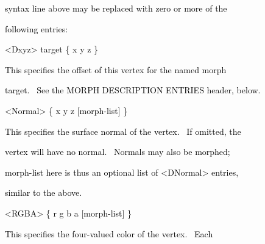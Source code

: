 \documentclass[a4paper]{article}
\newcommand\textstyleOOoComputerKeyWord[1]{\textrm{\textcolor[rgb]{0.0,0.0,0.5019608}{#1}}}
\begin{document}
{\color{black}
\textstyleOOoComputerKeyWord{\textcolor{black}{\ \ \ \ syntax line above may be replaced with zero or more of the}}}

{\color{black}
\textstyleOOoComputerKeyWord{\textcolor{black}{\ \ \ \ following entries:}}}


\bigskip


\bigskip


\bigskip

{\color{black}
\textstyleOOoComputerKeyWord{\textcolor{black}{\ \ \ \ {\textless}Dxyz{\textgreater} target \{ x y z \}}}}


\bigskip

{\color{black}
\textstyleOOoComputerKeyWord{\textcolor{black}{\ \ \ \ This specifies the offset of this vertex for the named morph}}}

{\color{black}
\textstyleOOoComputerKeyWord{\textcolor{black}{\ \ \ \ target. \ See the {\textquotedbl}MORPH DESCRIPTION
ENTRIES{\textquotedbl} header, below.}}}


\bigskip


\bigskip

{\color{black}
\textstyleOOoComputerKeyWord{\textcolor{black}{\ \ \ \ {\textless}Normal{\textgreater} \{ x y z [morph-list] \}}}}


\bigskip

{\color{black}
\textstyleOOoComputerKeyWord{\textcolor{black}{\ \ \ \ This specifies the surface normal of the vertex. \ If omitted,
the}}}

\clearpage
\bigskip

{\color{black}
\textstyleOOoComputerKeyWord{\textcolor{black}{\ \ \ \ vertex will have no normal. \ Normals may also be morphed;}}}

{\color{black}
\textstyleOOoComputerKeyWord{\textcolor{black}{\ \ \ \ morph-list here is thus an optional list of
{\textless}DNormal{\textgreater} entries,}}}

{\color{black}
\textstyleOOoComputerKeyWord{\textcolor{black}{\ \ \ \ similar to the above.}}}


\bigskip


\bigskip

{\color{black}
\textstyleOOoComputerKeyWord{\textcolor{black}{\ \ \ \ {\textless}RGBA{\textgreater} \{ r g b a [morph-list] \}}}}


\bigskip

{\color{black}
\textstyleOOoComputerKeyWord{\textcolor{black}{\ \ \ \ This specifies the four-valued color of the vertex. \ Each}}}
\end{document}
